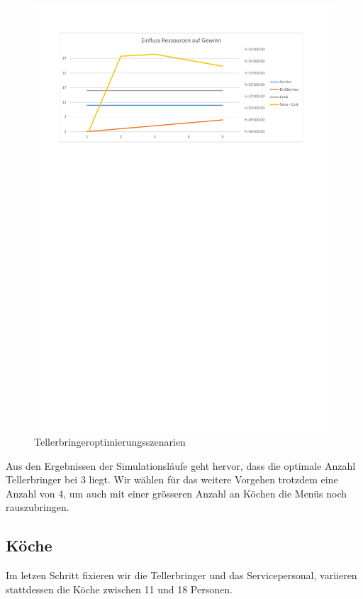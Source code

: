 \documentclass[ngerman,a4paper,12pt]{scrreprt}
\begin{document}
				\begin{figure}[H]
					\centering
						\includegraphics[trim=2cm 22.75cm 2.5cm 2cm, clip=true,width=\textwidth]{../Auswertung/3_DishService.pdf}
						\caption[Tellerbringeroptimierungsszenarien]{Tellerbringeroptimierungsszenarien}
						\label{Tellerbringeroptimierungsszenarien}
				\end{figure}				
				
				Aus den Ergebnissen der Simulationsläufe geht hervor, dass die optimale Anzahl Tellerbringer bei 3 liegt. Wir wählen für das weitere Vorgehen trotzdem eine Anzahl von 4, um auch mit einer grösseren Anzahl an Köchen die Menüs noch rauszubringen.

			\subsection{Köche}
				Im letzen Schritt fixieren wir die Tellerbringer und das Servicepersonal, variieren stattdessen die Köche zwischen 11 und 18 Personen.
				
\end{document}
